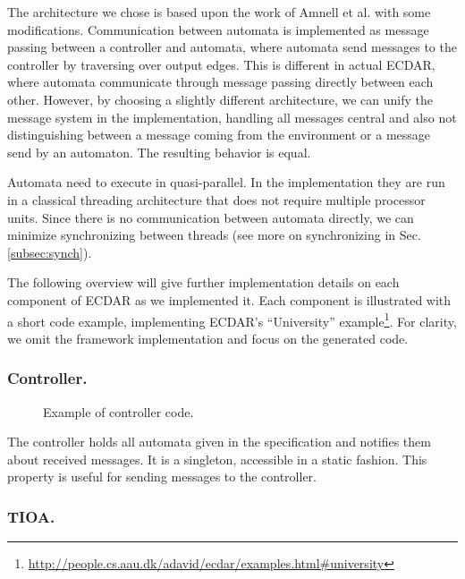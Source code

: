 The architecture we chose is based upon the work of Amnell et
al.\cite{amnell_code_2002} with some modifications. Communication between
automata is implemented as message passing between a controller and automata,
where automata send messages to the controller by traversing over output
edges. This is different in actual ECDAR, where automata communicate through
message passing directly between each other. However, by choosing a slightly
different architecture, we can unify the message system in the implementation,
handling all messages central and also not distinguishing between a message
coming from the environment or a message send by an automaton. The resulting
behavior is equal.

Automata need to execute in quasi-parallel. In the implementation they are run
in a classical threading architecture that does not require multiple processor
units. Since there is no communication between automata directly, we can
minimize synchronizing between threads (see more on synchronizing in
Sec. \ref{subsec:synch}).

The following overview will give further implementation details on each
component of ECDAR as we implemented it. Each component is illustrated with a
short code example, implementing ECDAR's ``University''
example\footnote{\url{http://people.cs.aau.dk/adavid/ecdar/examples.html#university}}. For
clarity, we omit the framework implementation and focus on the generated code.

\subsubsection{Controller.}

\begin{figure}[t]

\caption{Example of controller code.}
\label{controller-example}
\end{figure}

The controller holds all automata given in the specification and notifies them
about received messages. It is a singleton, accessible in a static fashion.
This property is useful for sending messages to the controller.

\subsubsection{TIOA.}

